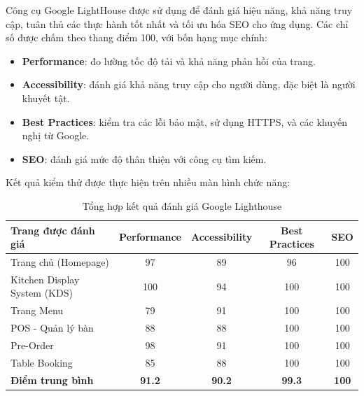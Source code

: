 Công cụ Google LightHouse được sử dụng để đánh giá hiệu năng, khả năng truy cập, tuân thủ các thực hành tốt nhất và tối ưu hóa SEO cho ứng dụng.  
Các chỉ số được chấm theo thang điểm 100, với bốn hạng mục chính:  

\begin{itemize}
    \item \textbf{Performance}: đo lường tốc độ tải và khả năng phản hồi của trang.  
    \item \textbf{Accessibility}: đánh giá khả năng truy cập cho người dùng, đặc biệt là người khuyết tật.  
    \item \textbf{Best Practices}: kiểm tra các lỗi bảo mật, sử dụng HTTPS, và các khuyến nghị từ Google.  
    \item \textbf{SEO}: đánh giá mức độ thân thiện với công cụ tìm kiếm.  
\end{itemize}

Kết quả kiểm thử được thực hiện trên nhiều màn hình chức năng:

\begin{table}[h!]
    \centering
    \caption{Tổng hợp kết quả đánh giá Google Lighthouse}
    \label{tab:lighthouse-results}
    \begin{tabular}{|l|c|c|c|c|}
    \hline
    \textbf{Trang được đánh giá} & \textbf{Performance} & \textbf{Accessibility} & \textbf{Best Practices} & \textbf{SEO} \\ \hline
    Trang chủ (Homepage) & 97 & 89 & 96 & 100 \\ \hline
    Kitchen Display System (KDS) & 100 & 94 & 100 & 100 \\ \hline
    Trang Menu & 79 & 91 & 100 & 100 \\ \hline
    POS - Quản lý bàn & 88 & 88 & 100 & 100 \\ \hline
    Pre-Order & 98 & 91 & 100 & 100 \\ \hline
    Table Booking & 85 & 88 & 100 & 100 \\ \hline
    \hline
    \textbf{Điểm trung bình} & \textbf{91.2} & \textbf{90.2} & \textbf{99.3} & \textbf{100} \\ \hline
    \end{tabular}
\end{table}


